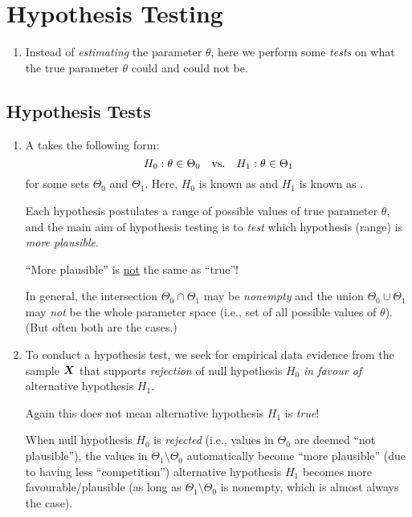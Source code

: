 \section{Hypothesis Testing}
\label{sect:hypothesis-testing}
\begin{enumerate}
\item Instead of \emph{estimating} the parameter \(\theta\), here we perform
some \emph{tests} on what the true parameter \(\theta\) could and could not
be.
\end{enumerate}
\subsection{Hypothesis Tests}
\begin{enumerate}
\item A  takes the following form:
\[
H_0: \theta\in\Theta_0\qqtext{vs.}H_1:\theta\in\Theta_1
\]
for some sets \(\Theta_0\) and \(\Theta_1\). Here, \(H_0\) is known as
 and \(H_1\) is known as .

Each hypothesis postulates a range of possible values of true parameter
\(\theta\), and the main aim of hypothesis testing is to \emph{test} which
hypothesis (range) is \emph{more plausible}. \begin{warning}
``More plausible'' is \underline{not} the same as ``true''!
\end{warning}

\begin{note}
In general, the intersection \(\Theta_0\cap\Theta_1\) may be \emph{nonempty}
and the union \(\Theta_0\cup\Theta_1\) may \emph{not} be the whole parameter
space (i.e., set of all possible values of \(\theta\)). (But often both are the
cases.)
\end{note}
\item To conduct a hypothesis test, we seek for empirical data evidence from
the sample \(\vb*{X}\) that supports {\color{red}\emph{rejection}} of null
hypothesis \(H_0\) {\color{ForestGreen}\emph{in favour of}} alternative
hypothesis \(H_1\). \begin{warning}
Again this does not mean alternative hypothesis \(H_1\) is \emph{true}!
\end{warning}

\begin{note}
When null hypothesis \(H_0\) is \emph{rejected} (i.e., values in \(\Theta_0\)
are deemed ``not plausible''), the values in \(\Theta_1\setminus\Theta_0\)
automatically become ``more plausible'' (due to having less ``competition'')
 alternative hypothesis \(H_1\) becomes more
favourable/plausible (as long as \(\Theta_1\setminus\Theta_0\) is nonempty,
which is almost always the case).
\end{note}


\end{enumerate}
